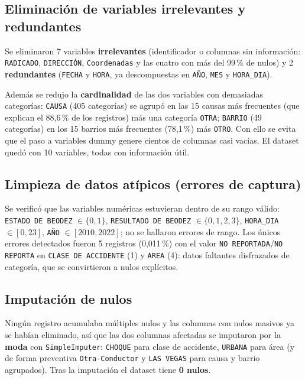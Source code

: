 \documentclass[11pt]{article}
\newcommand{\vartxt}[1]{\texttt{#1}}
\begin{document}
\subsection{Eliminación de variables irrelevantes y redundantes}

Se eliminaron 7 variables \textbf{irrelevantes} (identificador o columnas sin información: \vartxt{RADICADO}, \vartxt{DIRECCIÓN}, \vartxt{Coordenadas} y las cuatro con más del 99\,\% de nulos) y 2 \textbf{redundantes} (\vartxt{FECHA} y \vartxt{HORA}, ya descompuestas en \vartxt{AÑO}, \vartxt{MES} y \vartxt{HORA\_DIA}).

Además se redujo la \textbf{cardinalidad} de las dos variables con demasiadas categorías: \vartxt{CAUSA} (405 categorías) se agrupó en las 15 causas más frecuentes (que explican el 88,6\,\% de los registros) más una categoría \vartxt{OTRA}; \vartxt{BARRIO} (49 categorías) en los 15 barrios más frecuentes (78,1\,\%) más \vartxt{OTRO}. Con ello se evita que el paso a variables dummy genere cientos de columnas casi vacías. El dataset quedó con 10 variables, todas con información útil.

\subsection{Limpieza de datos atípicos (errores de captura)}

Se verificó que las variables numéricas estuvieran dentro de su rango válido: \vartxt{ESTADO DE BEODEZ} $\in \{0,1\}$, \vartxt{RESULTADO DE BEODEZ} $\in \{0,1,2,3\}$, \vartxt{HORA\_DIA} $\in [0,23]$, \vartxt{AÑO} $\in [2010,2022]$; no se hallaron errores de rango. Los únicos errores detectados fueron 5 registros (0,011\,\%) con el valor \vartxt{NO REPORTADA}/\vartxt{NO REPORTA} en \vartxt{CLASE DE ACCIDENTE} (1) y \vartxt{AREA} (4): datos faltantes disfrazados de categoría, que se convirtieron a nulos explícitos.

\subsection{Imputación de nulos}

Ningún registro acumulaba múltiples nulos y las columnas con nulos masivos ya se habían eliminado, así que las dos columnas afectadas se imputaron por la \textbf{moda} con \vartxt{SimpleImputer}: \vartxt{CHOQUE} para clase de accidente, \vartxt{URBANA} para área (y de forma preventiva \vartxt{Otra-Conductor} y \vartxt{LAS VEGAS} para causa y barrio agrupados). Tras la imputación el dataset tiene \textbf{0 nulos}.
\end{document}
